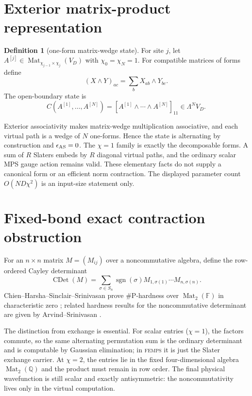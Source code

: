 \documentclass[11pt]{article}
\theoremstyle{definition}
\newtheorem{definition}[theorem]{Definition}
\newcommand{\Mat}{\operatorname{Mat}}
\newcommand{\CDet}{\operatorname{CDet}}
\newcommand{\FEMPS}{\textnormal{\textsc{femps}}}
\begin{document}
\section{Exterior matrix-product representation}

\begin{definition}[one-form matrix-wedge state]
For site $j$, let
$A^{[j]}\in\Mat_{\chi_{j-1}\times\chi_j}(V_D)$ with
$\chi_0=\chi_N=1$.  For compatible matrices of forms define
\[
 (X\wedge Y)_{ac}=\sum_b X_{ab}\wedge Y_{bc}.
\]
The open-boundary state is
\begin{equation}
 C(A^{[1]},\ldots,A^{[N]})=
 [A^{[1]}\wedge\cdots\wedge A^{[N]}]_{11}
 \in\Lambda^N V_D.
 \label{eq:femps}
\end{equation}
\end{definition}

Exterior associativity makes matrix-wedge multiplication associative, and each
virtual path is a wedge of $N$ one-forms.  Hence the state is alternating by
construction and $\epsilon_{\rm AS}=0$.  The $\chi=1$ family is exactly the
decomposable forms.  A sum of $R$ Slaters embeds by $R$ diagonal virtual paths,
and the ordinary scalar MPS gauge action remains valid.  These elementary
facts do not supply a canonical form or an efficient norm contraction.  The
displayed parameter count $O(ND\chi^2)$ is an input-size statement only.

\section{Fixed-bond exact contraction obstruction}

For an $n\times n$ matrix $M=(M_{ij})$ over a noncommutative algebra, define
the row-ordered Cayley determinant
\[
 \CDet(M)=\sum_{\sigma\in S_n}\operatorname{sgn}(\sigma)
 M_{1,\sigma(1)}\cdots M_{n,\sigma(n)}.
\]
Chien--Harsha--Sinclair--Srinivasan prove \#P-hardness over
$\Mat_2(\mathbb F)$ in characteristic zero
\cite{ChienHarshaSinclairSrinivasan2011NoncommDet}; related hardness results
for the noncommutative determinant are given by Arvind--Srinivasan
\cite{ArvindSrinivasan2018NoncommDet}.

The distinction from exchange is essential.  For scalar entries ($\chi=1$),
the factors commute, so the same alternating permutation sum is the ordinary
determinant and is computable by Gaussian elimination; in \FEMPS{} it is just
the Slater exchange carrier.  At $\chi=2$, the entries lie in the fixed
four-dimensional algebra $\Mat_2(\mathbb Q)$ and the product must remain in row
order.  The final physical wavefunction is still scalar and exactly
antisymmetric: the noncommutativity lives only in the virtual computation.
\end{document}
